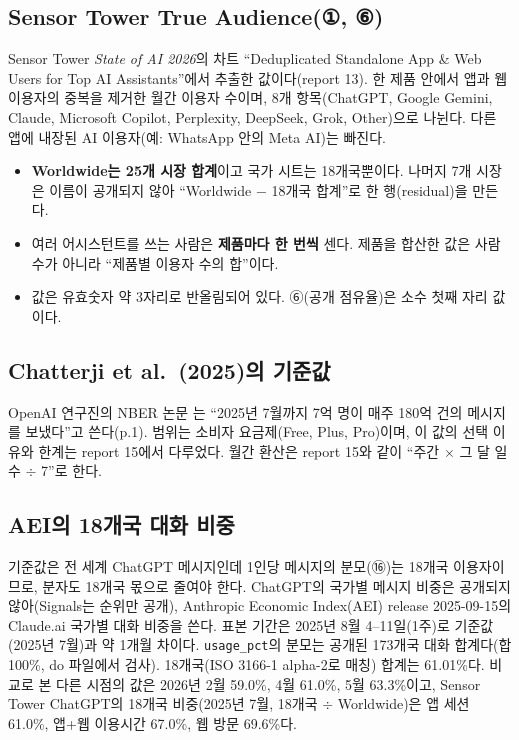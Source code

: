 \documentclass[11pt]{article}
\begin{document}
\subsection{Sensor Tower True Audience(①, ⑥)}
Sensor Tower \textit{State of AI 2026}의 차트 ``Deduplicated Standalone App \& Web Users for Top AI Assistants''에서 추출한 값이다(report 13). 한 제품 안에서 앱과 웹 이용자의 중복을 제거한 월간 이용자 수이며, 8개 항목(ChatGPT, Google Gemini, Claude, Microsoft Copilot, Perplexity, DeepSeek, Grok, Other)으로 나뉜다. 다른 앱에 내장된 AI 이용자(예: WhatsApp 안의 Meta AI)는 빠진다.
\begin{itemize}
  \item \textbf{Worldwide는 25개 시장 합계}이고 국가 시트는 18개국뿐이다. 나머지 7개 시장은 이름이 공개되지 않아 ``Worldwide $-$ 18개국 합계''로 한 행(residual)을 만든다.
  \item 여러 어시스턴트를 쓰는 사람은 \textbf{제품마다 한 번씩} 센다. 제품을 합산한 값은 사람 수가 아니라 ``제품별 이용자 수의 합''이다.
  \item 값은 유효숫자 약 3자리로 반올림되어 있다. ⑥(공개 점유율)은 소수 첫째 자리 값이다.
\end{itemize}

\subsection{Chatterji et al.\ (2025)의 기준값}
OpenAI 연구진의 NBER 논문 \textcite{chatterji-2025-how-people-use-chatgpt}는 ``2025년 7월까지 7억 명이 매주 180억 건의 메시지를 보냈다''고 쓴다(p.1). 범위는 소비자 요금제(Free, Plus, Pro)이며, 이 값의 선택 이유와 한계는 report 15에서 다루었다. 월간 환산은 report 15와 같이 ``주간 $\times$ 그 달 일수 $\div$ 7''로 한다.

\subsection{AEI의 18개국 대화 비중}
기준값은 전 세계 ChatGPT 메시지인데 1인당 메시지의 분모(⑯)는 18개국 이용자이므로, 분자도 18개국 몫으로 줄여야 한다. ChatGPT의 국가별 메시지 비중은 공개되지 않아(Signals는 순위만 공개), Anthropic Economic Index(AEI) release 2025-09-15의 Claude.ai 국가별 대화 비중을 쓴다\parencite{appel-2025-uneven-geographic-and-enterprise-ai}. 표본 기간은 2025년 8월 4--11일(1주)로 기준값(2025년 7월)과 약 1개월 차이다. \texttt{usage\_pct}의 분모는 공개된 173개국 대화 합계다(합 100\%, do 파일에서 검사). 18개국(ISO 3166-1 alpha-2로 매칭) 합계는 61.01\%다. 비교로 본 다른 시점의 값은 2026년 2월 59.0\%, 4월 61.0\%, 5월 63.3\%이고, Sensor Tower ChatGPT의 18개국 비중(2025년 7월, 18개국 $\div$ Worldwide)은 앱 세션 61.0\%, 앱+웹 이용시간 67.0\%, 웹 방문 69.6\%다.
\end{document}

